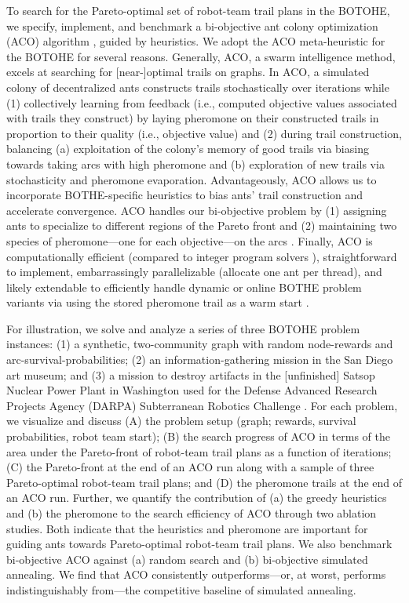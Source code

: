 \documentclass[fleqn,10pt,lineno]{wlpeerj}
\begin{document}
To search for the Pareto-optimal set of robot-team trail plans in the BOTOHE, we specify, implement, and benchmark a bi-objective ant colony optimization (ACO) algorithm \cite{iredi2001bi}, guided by heuristics.
We adopt the ACO meta-heuristic \cite{dorigo2006ant,bonabeau1999swarm,blum2005ant} for the BOTOHE for several reasons.
Generally, ACO, a swarm intelligence method, excels at searching for [near-]optimal trails on graphs.
In ACO, a simulated colony of decentralized ants constructs trails stochastically over iterations while 
(1) collectively learning from feedback (i.e., computed objective values associated with trails they construct) by laying pheromone on their constructed trails in proportion to their quality (i.e., objective value) and
(2) during trail construction, balancing 
(a) exploitation of the colony's memory of good trails via biasing towards taking arcs with high pheromone and 
(b) exploration of new trails via stochasticity and pheromone evaporation.
Advantageously, ACO allows us to incorporate BOTHE-specific heuristics to bias ants' trail construction and accelerate convergence.
ACO handles our bi-objective problem by (1) assigning ants to specialize to different regions of the Pareto front and (2) maintaining two species of pheromone---one for each objective---on the arcs \cite{iredi2001bi}.
Finally, ACO is computationally efficient (compared to integer program solvers \cite{pascariu2021train}), straightforward to implement, embarrassingly parallelizable (allocate one ant per thread), and likely extendable to efficiently handle dynamic or online BOTHE problem variants via using the stored pheromone trail as a warm start \cite{montemanni2005ant}.

For illustration, we solve and analyze a series of three BOTOHE problem instances:
(1) a synthetic, two-community graph with random node-rewards and arc-survival-probabilities;
(2) an information-gathering mission in the San Diego art museum;
and
(3) a mission to destroy artifacts in the [unfinished] Satsop Nuclear Power Plant in Washington used for the Defense Advanced Research Projects Agency (DARPA) Subterranean Robotics Challenge \cite{ackerman2022robots,orekhov2022darpa}.
For each problem, we visualize and discuss
(A) the problem setup (graph; rewards, survival probabilities, robot team start); 
(B) the search progress of ACO in terms of the area under the Pareto-front of robot-team trail plans as a function of iterations;
(C) the Pareto-front at the end of an ACO run along with a sample of three Pareto-optimal robot-team trail plans; and
(D) the pheromone trails at the end of an ACO run.
Further, we quantify the contribution of (a) the greedy heuristics and (b) the pheromone to the search efficiency of ACO through two ablation studies. Both indicate that the heuristics and pheromone are important for guiding ants towards Pareto-optimal robot-team trail plans.
We also benchmark bi-objective ACO against (a) random search and (b) bi-objective simulated annealing.
We find that ACO consistently outperforms---or, at worst, performs indistinguishably from---the competitive baseline of simulated annealing.
\end{document}
